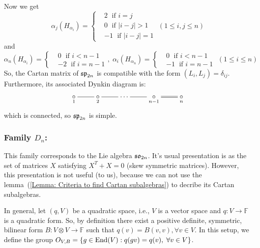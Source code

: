 \begin{itemize}
Now we get 
\begin{equation}
   \alpha_j(H_{\alpha_i})=\left\{\begin{aligned}
    & 2\;\text{ if } i=j\\
    & 0\;\text{ if } |i-j|>1\\        
    & -1\;\text{ if } |i-j|=1
    \end{aligned}\right.\; (1\leq i,j\leq n)
\end{equation}
and 
\begin{equation}
    \alpha_n(H_{\alpha_i})=\left\{\begin{aligned}
        & 0 \;\text{ if } i<n-1\\
        &-2\;\text{ if } i=n-1
    \end{aligned}\right.,\;
    \alpha_i(H_{\alpha_n})=\left\{\begin{aligned}
        & 0 \;\text{ if } i<n-1\\
        &-1\;\text{ if } i=n-1
    \end{aligned}\right.\;(1\leq i\leq n)
\end{equation}
So, the Cartan matrix of $\mathfrak{sp}_{2n}$ is compatible with the form $(L_i,L_j)=\delta_{ij}$. Furthermore, its 
associated Dynkin diagram is: 
\[
\xymatrix{
    \underset{1}{\circ}\ar@{-}[r]&\underset{2}{\circ}\ar@{-}[r]&
    \cdots\ar@{-}[r]&\underset{n-1}{\circ}\ar@{-}[r]<0.2ex>\ar@{-}[r]<-0.2ex>&\underset{n}{\circ}
}
\]
which is connected, so $\mathfrak{sp}_{2n}$ is simple.
\end{itemize}

\subsubsection{\texorpdfstring{Family $D_n$:}{Family :}}
This family corresponds to the Lie algebra $\mathfrak{so}_{2n}$. It's usual presentation is as the set of matrices $X$ satisfying 
$X^T+X=0$ (skew symmetric matrices). However, this presentation is not useful (to us), because we can not use the 
lemma~(\ref{Lemma: Criteria to find Cartan subalgebras}) to decribe its Cartan subalgebras.\par 

In general, let $(q,V)$ be a quadratic space, i.e., $V$ is a vector space and $q:V\to\mathbb{F}$ is a quadratic form. So, by definition 
there exist a positive definite, symmetric, bilinear form $B:V\otimes V\to\mathbb{F}$ such that $q(v)=B(v,v),\forall v\in V$. In this setup, we 
define the group $O_{V,B}=\{g\in\text{End}(V): q(gv)=q(v),\;\forall v\in V\}$.\par  

